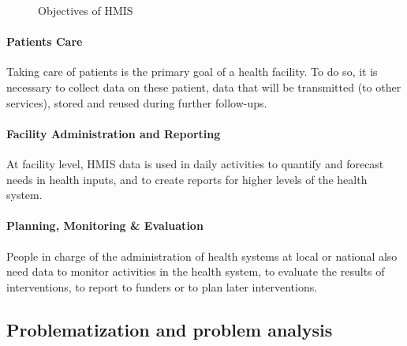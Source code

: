 \documentclass[a4paper,11pt,final,twoside]{article}
\begin{document}
\begin{figure}[htp]
\centering
{}
\caption{Objectives of HMIS}
\label{HMISGoals}
\end{figure}

\paragraph{Patients Care} Taking care of patients is the primary goal of a health facility. To do so, it is necessary to collect data on these patient, data that will be transmitted (to other services), stored and reused during further follow-ups.

\paragraph{Facility Administration and Reporting} At facility level, HMIS data is used in daily activities to quantify and forecast needs in health inputs, and to create reports for higher levels of the health system.

\paragraph{Planning, Monitoring \& Evaluation } People in charge of the administration of health systems at local or national also need data to monitor activities in the health system, to evaluate the results of interventions, to report to funders or to plan later interventions.

\subsection{Problematization and problem analysis}
\end{document}
